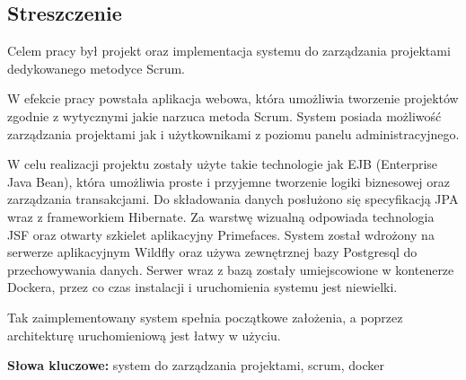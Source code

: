 \subsection*{Streszczenie}

Celem pracy był projekt oraz implementacja systemu do zarządzania projektami dedykowanego metodyce Scrum.

W efekcie pracy powstała aplikacja webowa, która umożliwia tworzenie projektów zgodnie z wytycznymi jakie narzuca metoda Scrum. System posiada możliwość zarządzania projektami jak i użytkownikami z poziomu panelu administracyjnego.

W celu realizacji projektu zostały użyte takie technologie jak EJB (Enterprise Java Bean), która umożliwia proste i przyjemne tworzenie logiki biznesowej oraz zarządzania transakcjami. Do składowania danych posłużono się specyfikacją JPA wraz z frameworkiem Hibernate. Za warstwę wizualną odpowiada technologia JSF oraz otwarty szkielet aplikacyjny Primefaces. System został wdrożony na serwerze aplikacyjnym Wildfly oraz używa zewnętrznej bazy Postgresql do przechowywania danych. Serwer wraz z bazą zostały umiejscowione w kontenerze Dockera, przez co czas instalacji i uruchomienia systemu jest niewielki.

Tak zaimplementowany system spełnia początkowe założenia, a poprzez architekturę uruchomieniową jest łatwy w użyciu.


\vspace{1cm}
\noindent\textbf{Słowa kluczowe:} system do zarządzania projektami, scrum, docker